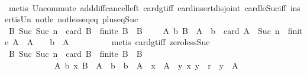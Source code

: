 \begin{isabellebody}
\ \ \ \ \ \ \ \ \isamarkupfalse%
\ {\isacharparenleft}metis\ Un{\isacharunderscore}commute\ add{\isacharunderscore}diff{\isacharunderscore}cancel{\isacharunderscore}left{\isacharprime}\ card{\isacharunderscore}gt{\isacharunderscore}{}{\isacharunderscore}iff\ card{\isacharunderscore}insert{\isacharunderscore}disjoint\ card{\isacharunderscore}le{\isacharunderscore}Suc{\isacharunderscore}iff\ insert{\isacharunderscore}is{\isacharunderscore}Un\ not{\isacharunderscore}le\ not{\isacharunderscore}less{\isacharunderscore}eq{\isacharunderscore}eq\ plus{\isacharunderscore}{}{\isacharunderscore}eq{\isacharunderscore}Suc{\isacharparenright}\isanewline
\ \ \ \ \ \ \isamarkupfalse%
\ \isamarkupfalse%
\ {\isachardoublequoteopen}{\isasymforall}B{\isachardot}\ Suc\ {\isacharparenleft}Suc\ n{\isacharparenright}\ {\isacharequal}\ card\ B\ {\isasymlongrightarrow}\ finite\ B\ {\isasymlongrightarrow}\ B\ {\isasymnoteq}\ {\isasymemptyset}\ {\isasymlongrightarrow}\ {\isacharparenleft}{\isasymexists}\ A{\isacharprime}\ b{\isachardot}\ B\ {\isacharequal}\ A{\isacharprime}\ {\isasymunion}\ {\isacharbraceleft}b{\isacharbraceright}\ {\isasymand}\ card\ A{\isacharprime}\ {\isacharequal}\ Suc\ n\ {\isasymand}\ finite\ A{\isacharprime}\ {\isasymand}\ A{\isacharprime}\ {\isasymnoteq}\ {\isasymemptyset}\ {\isasymand}\ b\ {\isasymnotin}\ A{\isacharprime}{\isacharparenright}{\isachardoublequoteclose}\isanewline
\ \ \ \ \ \ \ \ \isamarkupfalse%
\ {\isacharparenleft}metis\ card{\isacharunderscore}gt{\isacharunderscore}{}{\isacharunderscore}iff\ zero{\isacharunderscore}less{\isacharunderscore}Suc{\isacharparenright}\isanewline
\ \ \ \ \ \ \isamarkupfalse%
\ \isamarkupfalse%
\ {\isachardoublequoteopen}{\isasymforall}B{\isachardot}\ Suc\ {\isacharparenleft}Suc\ n{\isacharparenright}\ {\isacharequal}\ card\ B\ {\isasymlongrightarrow}\ finite\ B\ {\isasymlongrightarrow}\ B\ {\isasymnoteq}\ {\isasymemptyset}\isanewline
\ \ \ \ \ \ \ \ \ \ {\isasymlongrightarrow}\ {\isacharparenleft}{\isasymexists}\ A{\isacharprime}\ b\ x{\isachardot}\ B\ {\isacharequal}\ A{\isacharprime}\ {\isasymunion}\ {\isacharbraceleft}b{\isacharbraceright}\ {\isasymand}\ b\ {\isasymnotin}\ A{\isacharprime}\ {\isasymand}\ x\ {\isasymin}\ A{\isacharprime}\ {\isasymand}\ {\isacharparenleft}{\isasymforall}y{\isachardot}\ {\isacharparenleft}x{\isacharcomma}\ y{\isacharparenright}\ {\isasymin}\ r\ {\isasymlongrightarrow}\ y\ {\isasymnotin}\ A{\isacharprime}{\isacharparenright}{\isacharparenright}{\isachardoublequoteclose}\isanewline

\end{isabellebody}
